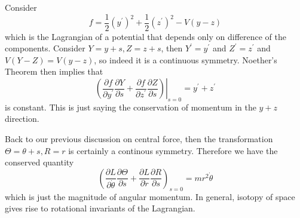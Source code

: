\begin{example}
    Consider
    $$f=\frac{1}{2}(y^\prime)^2+\frac{1}{2}(z^\prime)^2-V(y-z)$$
    which is the Lagrangian of a potential that depends only on difference of the components.
    Consider $Y=y+s, Z=z+s$, then $Y^\prime=y^\prime$ and $Z^\prime=z^\prime$ and $V(Y-Z)=V(y-z)$, so indeed it is a continuous symmetry.
    Noether's Theorem then implies that
    $$\left.\left( \frac{\partial f}{\partial y^\prime}\frac{\partial Y}{\partial s}+\frac{\partial f}{\partial z^\prime}\frac{\partial Z}{\partial s} \right)\right|_{s=0}=y^\prime+z^\prime$$
    is constant.
    This is just saying the conservation of momentum in the $y+z$ direction.
\end{example}
\begin{example}
    Back to our previous discussion on central force, then the transformation $\Theta=\theta+s,R=r$ is certainly a continous symmetry.
    Therefore we have the conserved quantity
    $$\left( \frac{\partial L}{\partial\dot{\theta}}\frac{\partial\Theta}{\partial s}+\frac{\partial L}{\partial\dot{r}}\frac{\partial R}{\partial s} \right)_{s=0}=mr^2\dot{\theta}$$
    which is just the magnitude of angular momentum.
    In general, isotopy of space gives rise to rotational invariants of the Lagrangian.
\end{example}
